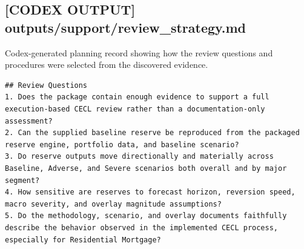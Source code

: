 \documentclass[11pt]{article}
\begin{document}
\subsection*{[CODEX OUTPUT] outputs/support/review\_strategy.md}
Codex-generated planning record showing how the review questions and procedures were selected from the discovered evidence.
\begin{Verbatim}[fontsize=\small]
## Review Questions
1. Does the package contain enough evidence to support a full execution-based CECL review rather than a documentation-only assessment?
2. Can the supplied baseline reserve be reproduced from the packaged reserve engine, portfolio data, and baseline scenario?
3. Do reserve outputs move directionally and materially across Baseline, Adverse, and Severe scenarios both overall and by major segment?
4. How sensitive are reserves to forecast horizon, reversion speed, macro severity, and overlay magnitude assumptions?
5. Do the methodology, scenario, and overlay documents faithfully describe the behavior observed in the implemented CECL process, especially for Residential Mortgage?
\end{Verbatim}
\end{document}
